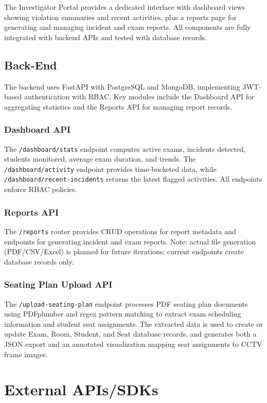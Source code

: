 The Investigator Portal provides a dedicated interface with dashboard views showing violation summaries and recent activities, plus a reports page for generating and managing incident and exam reports. All components are fully integrated with backend APIs and tested with database records.

\subsection{Back-End}

The backend uses FastAPI with PostgreSQL and MongoDB, implementing JWT-based authentication with RBAC. Key modules include the Dashboard API for aggregating statistics and the Reports API for managing report records.
\subsubsection*{Dashboard API}

The \texttt{/dashboard/stats} endpoint computes active exams, incidents detected, students monitored, average exam duration, and trends. The \texttt{/dashboard/activity} endpoint provides time-bucketed data, while \texttt{/dashboard/recent-incidents} returns the latest flagged activities. All endpoints enforce RBAC policies.

\subsubsection*{Reports API}

The \texttt{/reports} router provides CRUD operations for report metadata and endpoints for generating incident and exam reports. Note: actual file generation (PDF/CSV/Excel) is planned for future iterations; current endpoints create database records only.

\subsubsection*{Seating Plan Upload API}

The \texttt{/upload-seating-plan} endpoint processes PDF seating plan documents using PDFplumber and regex pattern matching to extract exam scheduling information and student seat assignments. The extracted data is used to create or update Exam, Room, Student, and Seat database records, and generates both a JSON export and an annotated visualization mapping seat assignments to CCTV frame images.
\clearpage
\section{External APIs/SDKs}

